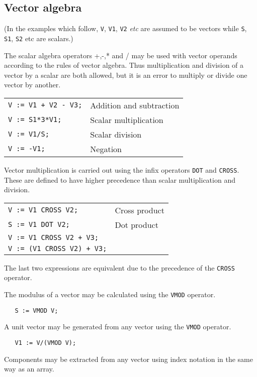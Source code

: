 \subsection{Vector algebra}

(In the examples which follow, {\tt V}, {\tt V1}, {\tt V2} {\em etc}
are assumed to be vectors while {\tt S}, {\tt S1}, {\tt S2} etc are scalars.)

  
 
The scalar algebra operators +,-,* and / may be used with
vector operands according to the rules of vector algebra.
Thus multiplication and division of a vector by a scalar
are both allowed, but it is an error to multiply or
divide one vector by another.

\begin{tabular}{l l}
{\tt V := V1 + V2 - V3;} & Addition and subtraction \\
{\tt V := S1*3*V1;} & Scalar multiplication \\
{\tt V := V1/S;} & Scalar division \\
{\tt V := -V1;} & Negation \\
\end{tabular}

  
\noindent Vector multiplication is carried out using the infix
operators {\tt DOT} and {\tt CROSS}. These are defined to have
higher precedence than scalar multiplication and
division.

\begin{tabular}{l l}
{\tt V := V1 CROSS V2;} & Cross product \\
{\tt S := V1 DOT V2;} & Dot product \\
{\tt V := V1 CROSS V2 + V3;} & \\
{\tt V := (V1 CROSS V2) + V3;} & \\
\end{tabular}

The last two expressions are equivalent due to the precedence of
the {\tt CROSS} operator.

The modulus of a vector may be calculated using the {\tt VMOD} operator.
\begin{verbatim}
   S := VMOD V;
\end{verbatim}
A unit vector may be generated from any vector using the {\tt VMOD}
operator.
\begin{verbatim}
   V1 := V/(VMOD V);
\end{verbatim}
Components may be extracted from any vector using index notation
in the same way as an array.

